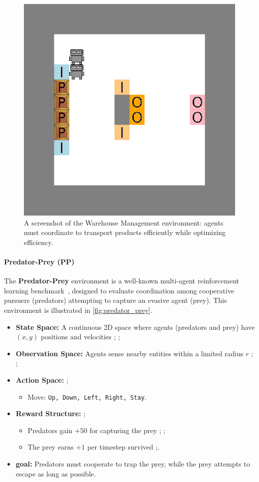 \documentclass[pdflatex,sn-mathphys-num]{sn-jnl}%
\theoremstyle{thmstyleone}%
\theoremstyle{thmstyletwo}%
\theoremstyle{thmstylethree}%
\begin{document}
\begin{figure}[h!]
  \centering
  \includegraphics[width=0.7\linewidth]{figures/wm.png}
  \caption{A screenshot of the Warehouse Management environment: agents must coordinate to transport products efficiently while optimizing efficiency.}
  \label{fig:warehouse}
\end{figure}

\paragraph{Predator-Prey (PP)}
The \textbf{Predator-Prey} environment is a well-known multi-agent reinforcement learning benchmark~\cite{lowe2017multi}, designed to evaluate coordination among cooperative pursuers (predators) attempting to capture an evasive agent (prey). This environment is illustrated in \autoref{fig:predator_prey}.

\begin{itemize}
    \item \textbf{State Space:} A continuous 2D space where agents (predators and prey) have $(x, y)$ positions and velocities ; ;
    \item \textbf{Observation Space:} Agents sense nearby entities within a limited radius $r$ ; ;
    \item \textbf{Action Space:}  ;
    \begin{itemize}
        \item Move: \texttt{Up, Down, Left, Right, Stay}.
    \end{itemize}
    \item \textbf{Reward Structure:} ;
    \begin{itemize}
        \item Predators gain $+50$ for capturing the prey ; ;
        \item The prey earns $+1$ per timestep survived ;.
    \end{itemize}
    \item \textbf{goal:} Predators must cooperate to trap the prey, while the prey attempts to escape as long as possible.
\end{itemize}
\end{document}
